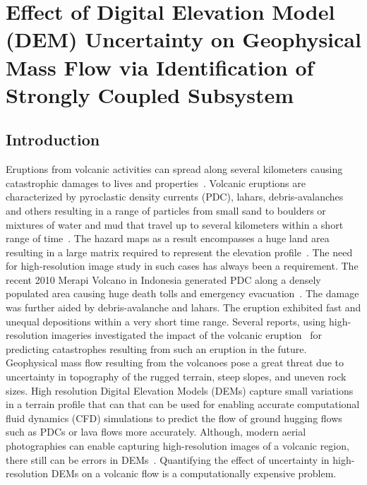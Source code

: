 \chapter{Effect of Digital Elevation Model (DEM) Uncertainty on Geophysical Mass Flow via Identification of Strongly Coupled Subsystem}
\label{chap:dem}

\section{Introduction}
\label{introduction}

Eruptions from volcanic activities can spread along several kilometers causing catastrophic damages to lives and properties~\cite{volcano_world,volcano_us}. Volcanic eruptions are characterized by pyroclastic density currents (PDC), lahars, debris-avalanches and others resulting in a range of particles from small sand to boulders or mixtures of water and mud that travel up to several kilometers within a short range of time~\cite{boudon19931984,petrie1987terrain,takahashi2000mechanical, felix2004relation}. The hazard maps as a result encompasses a huge land area resulting in a large matrix required to represent the elevation profile~\cite{luhr1981colima,rueda2005erupciones,voight2013galeras,volcano_helens}. The need for high-resolution image study in such cases has always been a requirement. The recent 2010 Merapi Volcano in Indonesia generated PDC along a densely populated area causing huge death tolls and emergency evacuation~\cite{wiki_merapi}. The damage was further aided by debris-avalanche and lahars. The eruption exhibited fast and unequal depositions within a very short time range. Several reports, using high-resolution imageries investigated the impact of the volcanic eruption~\cite{charbonnier2013evaluation,jousset20122010, thouret114surono} for predicting catastrophes resulting from such an eruption in the future. %
Geophysical mass flow resulting from the volcanoes pose a great threat due to uncertainty in topography of the rugged terrain, steep slopes, and uneven rock sizes. High resolution Digital Elevation Models (DEMs) capture small variations in a terrain profile that can that can be used for enabling accurate computational fluid dynamics (CFD) simulations to predict the flow of ground hugging flows such as PDCs or lava flows more accurately. Although, modern aerial photographies can enable capturing high-resolution images of a volcanic region, there still can be errors in DEMs~\cite{mitasova1996modelling}. Quantifying the effect of uncertainty in high-resolution DEMs on a volcanic flow is a computationally expensive problem. 


